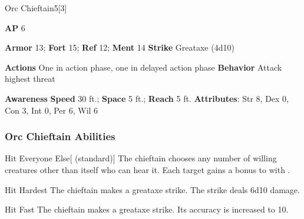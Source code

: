 \begin{monsection}{Orc Chieftain}{5}[3]
\vspace{-1em}\vspace{-1em}
\begin{spellcontent}
\begin{spelltargetinginfo}
{\textbf{AP} 6}

\pari \textbf{Armor} 13;
\textbf{Fort} 15;
\textbf{Ref} 12;
\textbf{Ment} 14
\pari \textbf{Strike} Greataxe  (4d10)


\pari \textbf{Actions} One in action phase, one in delayed action phase
\pari \textbf{Behavior} Attack highest threat
\end{spelltargetinginfo}
\end{spellcontent}

\begin{monsterfooter}
\pari \textbf{Awareness} 
\pari \textbf{Speed} 30 ft.;
\textbf{Space} 5 ft.;
\textbf{Reach} 5 ft.
\pari \textbf{Attributes}:
Str 8,
Dex 0,
Con 3,
Int 0,
Per 6,
Wil 6
\end{monsterfooter}
\end{monsection}


\subsubsection{Orc Chieftain Abilities}

\begin{freeability}{Hit Everyone Else}[ (standard)]
The chieftain chooses any number of willing creatures other than itself who can hear it.
Each target gains a  bonus to  with .
\end{freeability}

\vspace{0.5em}
\begin{freeability}{Hit Hardest}
The chieftain makes a greataxe strike.
The strike deals 6d10 damage.
\end{freeability}

\vspace{0.5em}
\begin{freeability}{Hit Fast}
The chieftain makes a greataxe strike.
Its accuracy is increased to 10.
\end{freeability}

